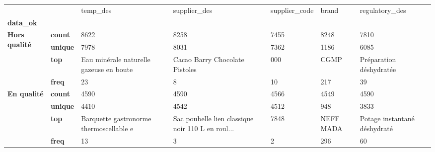 \begin{tabularx}{\linewidth}{lXXXXXX}
\toprule
           &      &                                 temp\_des &                                       supplier\_des & supplier\_code &      brand &                regulatory\_des \\
\textbf{data\_ok} & {} &                                          &                                                    &               &            &                               \\
\midrule
\multirow{4}{*}{\textbf{Hors qualité}} & \textbf{count} &                                     8622 &                                               8258 &          7455 &       8248 &                          7810 \\
           & \textbf{unique} &                                     7978 &                                               8031 &          7362 &       1186 &                          6085 \\
           & \textbf{top} &  Eau minérale naturelle gazeuse en boute &                     Cacao Barry Chocolate Pistoles &           000 &       CGMP &       Préparation déshydratée \\
           & \textbf{freq} &                                       23 &                                                  8 &            10 &        217 &                            39 \\
\cline{1-7}
\multirow{4}{*}{\textbf{En qualité}} & \textbf{count} &                                     4590 &                                               4590 &          4566 &       4549 &                          4590 \\
           & \textbf{unique} &                                     4410 &                                               4542 &          4512 &        948 &                          3833 \\
           & \textbf{top} &  Barquette gastronorme thermoscellable e &  Sac poubelle lien classique noir 110 L en roul... &          7848 &  NEFF MADA &  Potage instantané déshydraté \\
           & \textbf{freq} &                                       13 &                                                  3 &             2 &        296 &                            60 \\
\bottomrule
\end{tabularx}
